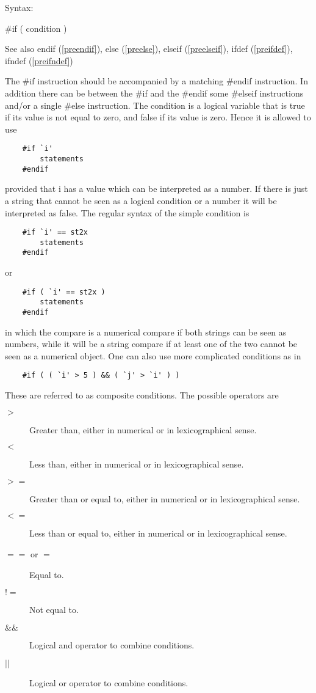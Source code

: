 \noindent Syntax:

\#if ( condition )
 
\noindent See also endif (\ref{preendif}),
            else (\ref{preelse}),
            elseif (\ref{preelseif}),
            ifdef (\ref{preifdef}),
            ifndef (\ref{preifndef})

\noindent The \#if instruction should be accompanied by a 
matching \#endif instruction. In addition there can be 
between the \#if and the \#endif some \#elseif instructions 
and/or a single \#else instruction. The condition is a 
logical variable that is true if its value is not equal to zero, and false 
if its value is zero. Hence it is allowed to use
\begin{verbatim}
    #if `i'
        statements
    #endif
\end{verbatim}
provided that i has a value which can be interpreted as a number. If there 
is just a string that cannot be seen as a logical condition 
or a number it will be interpreted as false. The regular syntax of the 
simple condition is
\begin{verbatim}
    #if `i' == st2x
        statements
    #endif
\end{verbatim}
or
\begin{verbatim}
    #if ( `i' == st2x )
        statements
    #endif
\end{verbatim}
in which the compare is a numerical compare if both strings can be seen as 
numbers, while it will be a string compare if at least one of the two 
cannot be seen as a numerical object. One can also use more complicated 
conditions as in
\begin{verbatim}
    #if ( ( `i' > 5 ) && ( `j' > `i' ) )
\end{verbatim}
These are referred to as composite conditions. The possible operators are
\begin{description}
\item[$>$] Greater than, either in numerical or in lexicographical sense.
\item[$<$] Less than, either in numerical or in lexicographical sense.
\item[$>=$] Greater than or equal to, either in numerical or in 
lexicographical sense.
\item[$<=$] Less than or equal to, either in numerical or in 
lexicographical sense.
\item[$==$ or $=$] Equal to.
\item[$!=$] Not equal to.
\item[$\&\&$] Logical and operator to combine conditions.
\item[$||$] Logical or operator to combine conditions.
\end{description}

